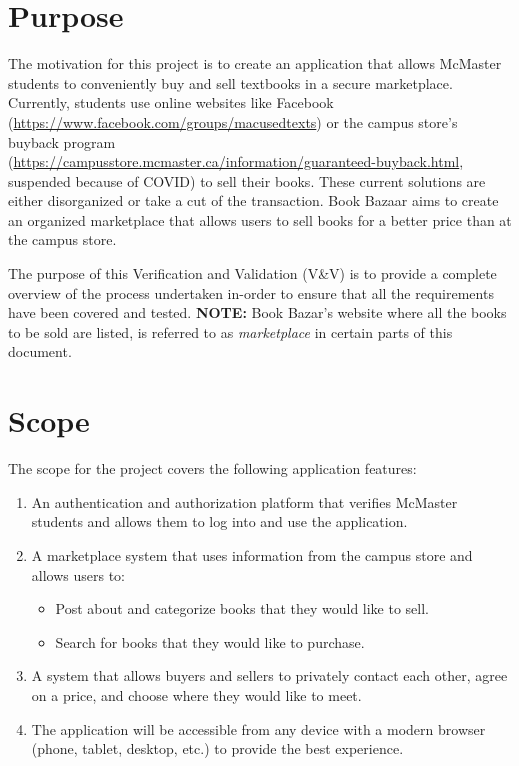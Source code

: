 \documentclass[fullpage]{article}
\newcommand{\be}{\begin{enumerate}}
\newcommand{\ee}{\end{enumerate}}
\newcommand{\bi}{\begin{itemize}}
\newcommand{\ei}{\end{itemize}}
\begin{document}
\section{Purpose}
The motivation for this project is to create an application that allows McMaster students to conveniently buy and sell textbooks in a secure marketplace. Currently, students use online websites like Facebook (\url{https://www.facebook.com/groups/macusedtexts}) or the campus store's buyback program \\ (\url{https://campusstore.mcmaster.ca/information/guaranteed-buyback.html}, suspended because of COVID) to sell their books. These current solutions are either disorganized or take a cut of the transaction. Book Bazaar aims to create an organized marketplace that allows users to sell books for a better price than at the campus store.

The purpose of this Verification and Validation (V\&V) is to provide a complete overview of the process undertaken in-order to ensure that all the requirements have been covered and tested.
\newline
\small{ \textbf{NOTE:} Book Bazar's website where all the books to be sold are listed, is referred to as \textit{marketplace} in certain parts of this document.}

\section{Scope}
The scope for the project covers the following application features:
\be
	\item An authentication and authorization platform that verifies McMaster students and allows them to log into and use the application.
	\item A marketplace system that uses information from the campus store and allows users to:
		\bi
			\item Post about and categorize books that they would like to sell.
			\item Search for books that they would like to purchase.
		\ei
	\item A system that allows buyers and sellers to privately contact each other, agree on a price, and choose where they would like to meet.
	\item The application will be accessible from any device with a modern browser (phone, tablet, desktop, etc.) to provide the best experience.
\ee
\end{document}
